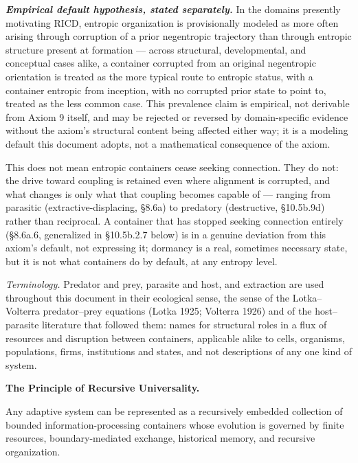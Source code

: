 \documentclass[
]{article}
\begin{document}
\emph{\textbf{Empirical default hypothesis, stated separately.}} In the
domains presently motivating RICD, entropic organization is
provisionally modeled as more often arising through corruption of a
prior negentropic trajectory than through entropic structure present at
formation --- across structural, developmental, and conceptual cases
alike, a container corrupted from an original negentropic orientation is
treated as the more typical route to entropic status, with a container
entropic from inception, with no corrupted prior state to point to,
treated as the less common case. This prevalence claim is empirical, not
derivable from Axiom 9 itself, and may be rejected or reversed by
domain-specific evidence without the axiom's structural content being
affected either way; it is a modeling default this document adopts, not
a mathematical consequence of the axiom.

This does not mean entropic containers cease seeking connection. They do
not: the drive toward coupling is retained even where alignment is
corrupted, and what changes is only what that coupling becomes capable
of --- ranging from parasitic (extractive-displacing, §8.6a) to
predatory (destructive, §10.5b.9d) rather than reciprocal. A container
that has stopped seeking connection entirely (§8.6a.6, generalized in
§10.5b.2.7 below) is in a genuine deviation from this axiom's default,
not expressing it; dormancy is a real, sometimes necessary state, but it
is not what containers do by default, at any entropy level.

\emph{Terminology.} Predator and prey, parasite and host, and extraction
are used throughout this document in their ecological sense, the sense
of the Lotka--Volterra predator--prey equations (Lotka 1925; Volterra
1926) and of the host--parasite literature that followed them: names for
structural roles in a flux of resources and disruption between
containers, applicable alike to cells, organisms, populations, firms,
institutions and states, and not descriptions of any one kind of system.

\textbf{The Principle of Recursive Universality.}

Any adaptive system can be represented as a recursively embedded
collection of bounded information-processing containers whose evolution
is governed by finite resources, boundary-mediated exchange, historical
memory, and recursive organization.
\end{document}
